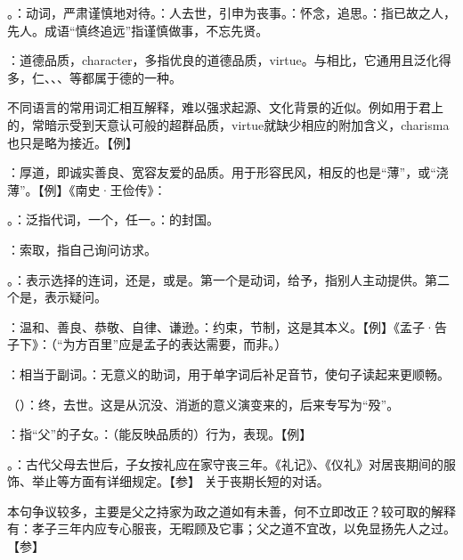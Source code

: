 {
\item {}。：动词，严肃谨慎地对待。：人去世，引申为丧事。：怀念，追思。：指已故之人，先人。成语“慎终追远”指谨慎做事，不忘先贤。
\item {}：道德品质，character，多指优良的道德品质，virtue。与相比，它通用且泛化得多，仁、、、等都属于德的一种。

不同语言的常用词汇相互解释，难以强求起源、文化背景的近似。例如用于君上的，常暗示受到天意认可般的超群品质，virtue就缺少相应的附加含义，charisma也只是略为接近。【例】 
\item {}：厚道，即诚实善良、宽容友爱的品质。用于形容民风，相反的也是“薄”，或“浇薄”。【例】《南史·王俭传》：
}
{}  %


{
\item {}。：泛指代词，一个，任一。：的封国。
\item {}：索取，指自己询问访求。
\item {}。：表示选择的连词，还是，或是。第一个是动词，给予，指别人主动提供。第二个是，表示疑问。
\item {}：温和、善良、恭敬、自律、谦逊。：约束，节制，这是其本义。【例】《孟子·告子下》：（“为方百里”应是孟子的表达需要，而非。）
\item {}：相当于副词。：无意义的助词，用于单字词后补足音节，使句子读起来更顺畅。
}
{}


{
\item {}（）：终，去世。这是从沉没、消逝的意义演变来的，后来专写为“殁”。
\item {}：指“父”的子女。：（能反映品质的）行为，表现。【例】 
\item {}。：古代父母去世后，子女按礼应在家守丧三年。《礼记》、《仪礼》对居丧期间的服饰、举止等方面有详细规定。【参】 关于丧期长短的对话。%

本句争议较多，主要是父之持家为政之道如有未善，何不立即改正？较可取的解释有：孝子三年内应专心服丧，无暇顾及它事；父之道不宜改，以免显扬先人之过。【参】 
}
{}


